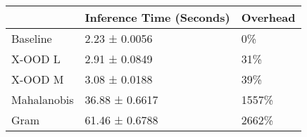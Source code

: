 \begin{tabular}{lll}
\toprule
{} & Inference Time (Seconds) & Overhead \\
\midrule
Baseline    &            2.23 ± 0.0056 &       0\% \\
X-OOD L     &            2.91 ± 0.0849 &      31\% \\
X-OOD M     &            3.08 ± 0.0188 &      39\% \\
Mahalanobis &           36.88 ± 0.6617 &    1557\% \\
Gram        &           61.46 ± 0.6788 &    2662\% \\
\bottomrule
\end{tabular}
